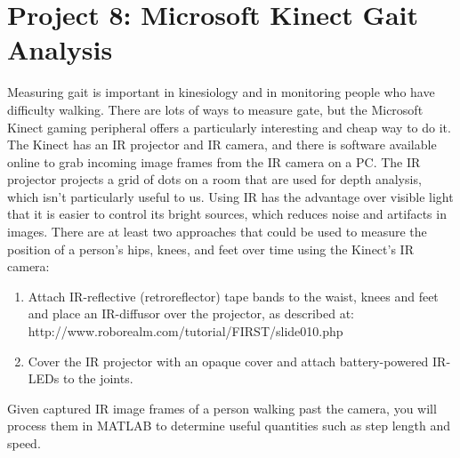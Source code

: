 \documentclass[12pt]{article}
\begin{document}
\section*{Project 8: Microsoft Kinect Gait Analysis}

Measuring gait is important in kinesiology and in monitoring people who have difficulty walking. 
There are lots of ways to measure gate, but the Microsoft Kinect gaming peripheral offers 
a particularly interesting and cheap way to do it. 
The Kinect has an IR projector and IR camera, and there is software available online to grab incoming image frames 
from the IR camera on a PC. 
The IR projector projects a grid of dots on a room that are used for depth analysis, 
which isn't particularly useful to us. 
Using IR has the advantage over visible light that it is easier to control its bright sources, 
which reduces noise and artifacts in images. 
There are at least two approaches that could be used to measure the position of a person's hips,
knees, and feet over time using the Kinect's IR camera:
\begin{enumerate}
\item Attach IR-reflective (retroreflector) tape bands to the waist, knees and feet and place an IR-diffusor over the projector, 
as described at:\\
 http://www.roborealm.com/tutorial/FIRST/slide010.php
\item Cover the IR projector with an opaque cover and attach battery-powered IR-LEDs to the joints. 
\end{enumerate}
Given captured IR image frames of a person walking past the camera, you will process them in MATLAB
to determine useful quantities such as step length and speed. 
\end{document}
